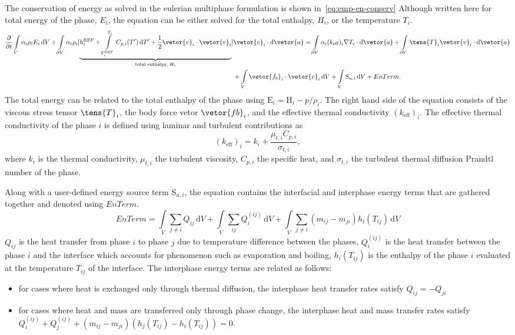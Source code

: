 The conservation of energy as solved in the eulerian multiphase formulation is shown in~\ref{eq:emp-en-conserv}
 Although written here for total energy of the phase, $E_{i}$, the equation can be either solved for the total
 enthalpy, $H_{i}$, or the temperature $T_{i}$. 
\begin{align}\label{eq:emp-en-conserv}
\frac{\partial}{\partial t}
\int\limits_{V} \alpha_{i} \rho_{i} E_{i} \,\mathrm{d}V
+ \int\limits_{\partial V} \alpha_{i} \rho_{i} 
[ 
    \underbrace{
        h_{i}^{\text{REF}} 
+ \int\limits_{T_{i}^{\text{REF}}}^{T_{i}} C_{p,i}(T') \,\mathrm{d}T' 
+ \frac{1}{2} \vetor{v}_{i} \cdot \vetor{v}_{i}
}_{\text{total enthalpy, $H_{i}$}}
]&
\vetor{v}_{i} \cdot \mathrm{d}\vetor{a} 
= \int\limits_{\partial V} \alpha_{i} (k_{\mathrm{eff}})_{i} \nabla T_{i} \cdot \mathrm{d}\vetor{a}
+ \int\limits_{\partial V} \tens{T}_{i} \vetor{v}_{i} \cdot \mathrm{d}\vetor{a}\nonumber \\
& + \int\limits_{V} \vetor{f_{b}}_{i} \cdot \vetor{v}_{i} \,\mathrm{d}V
+ \int\limits_{V} \mathrm{S}_{u,i} \,\mathrm{d}V + EnTerm.
\end{align}
The total energy can be related to the total enthalpy of the phase using  $\mathrm{E}_{i} = \mathrm{H}_{i} - p/\rho_{i}$.
The right hand side of the equation consists of the viscous stress tensor $\tens{T}_{i}$,
 the body force vetor $\vetor{f{b}}_{i}$, and the effective thermal conductivity $(k_{\mathrm{eff}})_{i}$.
 The effective thermal conductivity of the phase $i$ is defined using laminar and turbulent 
 contributions as \[(k_{\mathrm{eff}})_{i} = k_{i} + \frac{\mu_{t,i} C_{p,i}}{\sigma_{t,i}},\]
 where $k_{i}$ is the thermal conductivity, $\mu_{t,i}$ the turbulent viscosity,
 $C_{p,i}$ the specific heat, and $\sigma_{t,i}$ the turbulent thermal diffusion Prandtl number of the phase.

 Along with a user-defined energy source term $\mathrm{S}_{u,i}$,
 the equation contains the interfacial and interphase energy terms that are gathered together
 and denoted using $EnTerm$.
 \begin{equation}
    EnTerm = \int\limits_{V} \sum_{j \neq i} Q_{ij}\,\mathrm{d}V +
 \int\limits_{V} \sum_{ij} Q_{i}^{(ij)}\,\mathrm{d}V 
 + \int\limits_{V} \sum_{j \neq i} (m_{ij} - m_{ji})h_{i}(T_{ij})\,\mathrm{d}V
 \end{equation}
$Q_{ij}$ is the heat transfer from phase $i$ to phase $j$ due to temperature difference between the phases,
$Q_{i}^{(ij)}$ is the heat transfer between the phase $i$ and the interface which accounts for phenomenon
such as evaporation and boiling,
$h_{i}(T_{ij})$ is the enthalpy of the phase $i$ evaluated at the temperature $T_{ij}$ of the interface.
The interphase energy terms are related as follows:
\begin{itemize}
\item for cases where heat is exchanged only through thermal diffusion, the interphase heat transfer rates satisfy $Q_{ij} = -Q_{ji}$
\item for cases where heat and mass are transferred only through phase change, the interphase heat and mass transfer rates satisfy
$Q_{i}^{(ij)} + Q_{j}^{(ij)} + \left(m_{ij} - m_{ji}\right)\left(h_{j}(T_{ij}) - h_{i}(T_{ij})\right) = 0$.
\end{itemize}


